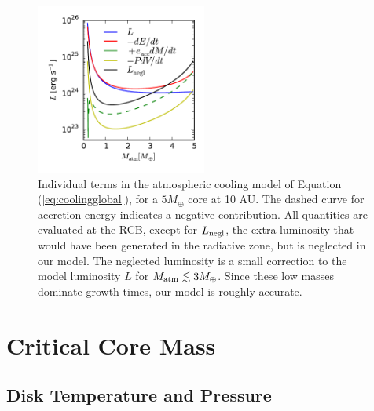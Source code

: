 \documentclass[apj, numberedappendix]{emulateapj}
\newcommand{\Eq}[1]{Equation\,(\ref{#1})}
\begin{document}
 
\begin{figure}[tb]
\centering
\includegraphics[width=0.5\textwidth]{../../figs/ModelAtmospheres/RadSelfGravPoly/PaperFigs/cooling_a10_Mc5_rcb_paper.pdf}
\caption{Individual terms in the atmospheric cooling model of \Eq{eq:coolingglobal}, for a $5 M_\oplus$ core at 10 AU.  The dashed curve for accretion energy indicates a negative contribution.  All quantities are evaluated at the RCB, except for $L_{\rm negl}$, the extra luminosity that would have been generated in the radiative zone, but is neglected in our model. The neglected luminosity is a small correction to the model luminosity $L$ for $M_{\rm atm} \lesssim 3 M_{\oplus}$.   Since these low masses dominate growth times, our model is roughly accurate.}
\label{fig:coolingterms}
\end{figure}



\section{Critical Core Mass}
\label{sec:critical}


\subsection{Disk Temperature and Pressure}
\label{sec:TPeffects}
\end{document}
